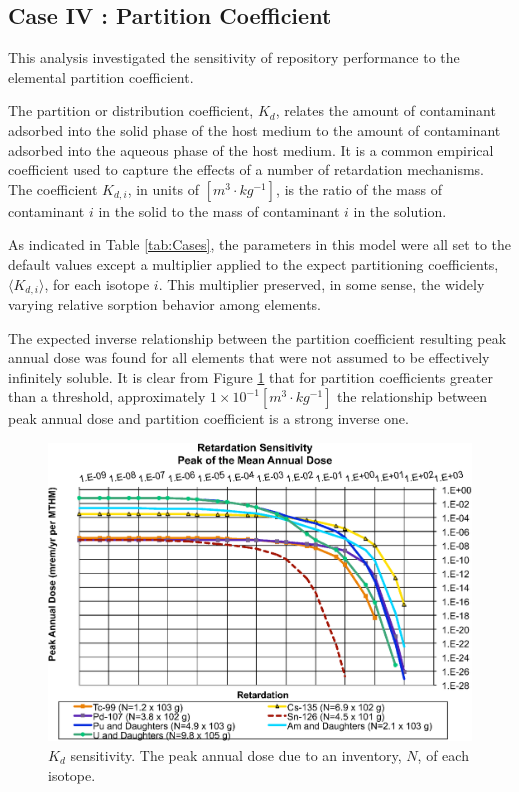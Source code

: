 
\subsection{Case IV : Partition Coefficient}

This analysis investigated the sensitivity of repository performance
to the elemental partition coefficient. 

The partition or distribution coefficient, $K_d$, relates the amount of contaminant adsorbed into the 
solid phase of the host medium to the amount of contaminant adsorbed into the 
aqueous phase of the host medium. It is a common empirical coefficient used to 
capture the effects of a number of retardation mechanisms. The coefficient 
$K_{d,i}$, in units of $[m^3\cdot kg^{-1}]$, is the ratio of the mass of 
contaminant $i$ in the solid to the mass of contaminant $i$ in the solution.

As indicated in Table \ref{tab:Cases}, the parameters in this model were all set 
to the default values except a multiplier applied to the expect partitioning 
coefficients, $\langle K_{d,i} \rangle$, for each isotope $i$. This multiplier 
preserved, in some sense, the widely varying 
relative sorption behavior among elements. 

The expected inverse relationship between the partition coefficient resulting 
peak annual dose was found for all elements that were not assumed to be 
effectively infinitely soluble.  It is clear from Figure \ref{fig:KdSum} that 
for partition coefficients greater than a threshold, approximately 
$1\times10^{-1}[m^3\cdot kg^{-1}]$ the relationship between 
peak annual dose and partition coefficient is a strong inverse one. 

\begin{figure}[H]
  \centering
  \includegraphics[width=\linewidth]{Retardation.eps}
  \caption{$K_d$ sensitivity.  The peak annual dose due to an inventory, 
  $N$, of each isotope.}
  \label{fig:KdSum}
\end{figure}

